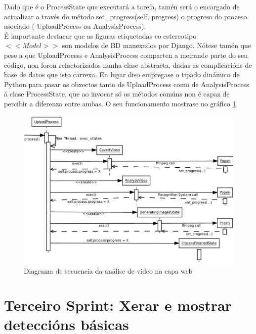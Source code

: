        Dado que é o ProcessState que executará a tarefa, tamén será o encargado de actualizar
        a través do método set\_progress(self, progress) o progreso do proceso asociado (
        UploadProcess ou AnalysisProcess).\\
        
        É importante destacar que as figuras etiquetadas co estereotipo $<<Model>>$ son modelos 
        de BD manexados por Django. Nótese tamén que pese a que UploadProcess e AnalysisProcess
        comparten a meirande parte do seu código, non foron refactorizados nunha clase abstracta,
        dadas as complicacións de base de datos que isto carrexa. En lugar diso empregase o 
        tipado dinámico de Python para pasar os obxectos tanto de UploadProcess como de 
        AnalysisProcess á clase ProcessState, que ao invocar só os métodos comúns non é capaz de 
        percibir a diferenza entre ambas. O seu funcionamento mostrase no gráfico
        \ref{fig:AnaliseVideoWeb}.
        
        \begin{figure}[htp]
        \begin{center}
            \includegraphics[scale=0.35]{figures/AnaliseVideoWeb.pdf}
            \caption{Diagrama de secuencia da análise de vídeo na capa web}
        \label{fig:AnaliseVideoWeb}
        \end{center}
        \end{figure}
    
\section{Terceiro Sprint: Xerar e mostrar deteccións básicas}

